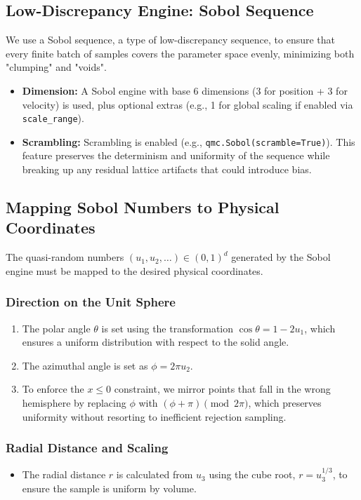 \documentclass{article}
\begin{document}
\subsection{Low-Discrepancy Engine: Sobol Sequence}
We use a Sobol sequence, a type of low-discrepancy sequence, to ensure that every finite batch of samples covers the parameter space evenly, minimizing both "clumping" and "voids".
\begin{itemize}
    \item \textbf{Dimension:} A Sobol engine with base 6 dimensions (3 for position + 3 for velocity) is used, plus optional extras (e.g., 1 for global scaling if enabled via \texttt{scale\_range}).
    \item \textbf{Scrambling:} Scrambling is enabled (e.g., \texttt{qmc.Sobol(scramble=True)}). This feature preserves the determinism and uniformity of the sequence while breaking up any residual lattice artifacts that could introduce bias.
\end{itemize}

\subsection{Mapping Sobol Numbers to Physical Coordinates}
The quasi-random numbers $(u_1, u_2, \dots) \in (0, 1)^d$ generated by the Sobol engine must be mapped to the desired physical coordinates.

\subsubsection*{Direction on the Unit Sphere}
\begin{enumerate}
    \item The polar angle $\theta$ is set using the transformation $\cos\theta = 1 - 2u_1$, which ensures a uniform distribution with respect to the solid angle.
    \item The azimuthal angle is set as $\phi = 2 \pi u_2$.
    \item To enforce the $x \le 0$ constraint, we mirror points that fall in the wrong hemisphere by replacing $\phi$ with $(\phi + \pi) \pmod{2\pi}$, which preserves uniformity without resorting to inefficient rejection sampling.
\end{enumerate}

\subsubsection*{Radial Distance and Scaling}
\begin{itemize}
    \item The radial distance $r$ is calculated from $u_3$ using the cube root, $r = u_3^{1/3}$, to ensure the sample is uniform by volume.
\end{itemize}
\end{document}
